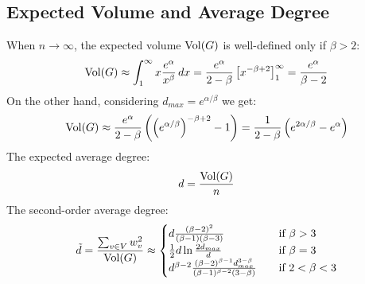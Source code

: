 \subsection{Expected Volume and Average Degree}

When $n\to\infty$, the expected volume $\operatorname*{Vol}(G)$ is well-defined only if $\beta>2$:
\begin{gather}
    \operatorname*{Vol}(G)\approx\int_1^{\infty}{x\frac{e^\alpha}{x^\beta}}\,dx
    =\frac{e^\alpha}{2-\beta}\left[ x^{-\beta+2} \right]_1^\infty
    =\frac{e^\alpha}{\beta-2}
\end{gather}
On the other hand, considering $d_{max}=e^{\alpha/\beta}$ we get:
\begin{equation}
    \label{eq:powerlaw-coin-toss-vol}
    \operatorname*{Vol}(G)\approx\frac{e^\alpha}{2-\beta}\left(\left(e^{\alpha/\beta}\right)^{-\beta+2}-1\right)
    =\frac{1}{2-\beta}\left(e^{2\alpha/\beta}-e^\alpha\right)
\end{equation}
The expected average degree:
\begin{equation}
    d=\frac{\operatorname*{Vol}(G)}{n}
\end{equation}
The second-order average degree:
\begin{equation}
    \tilde{d}=\frac{\sum_{v\in V}{w_v^2}}{\operatorname*{Vol}(G)}\approx
    \begin{cases}
        d\frac{(\beta-2)^2}{(\beta-1)(\beta-3)} & \quad \text{if } \beta>3\\
        \frac{1}{2}d\ln \frac{2d_{max}}{d} & \quad \text{if } \beta=3\\
        d^{\beta-2}\frac{(\beta-2)^{\beta-1}d_{max}^{3-\beta}}{(\beta-1)^{\beta-2}(3-\beta)} & \quad \text{if } 2<\beta<3
    \end{cases}
\end{equation}

%
%
%
%
%
%
%
%

